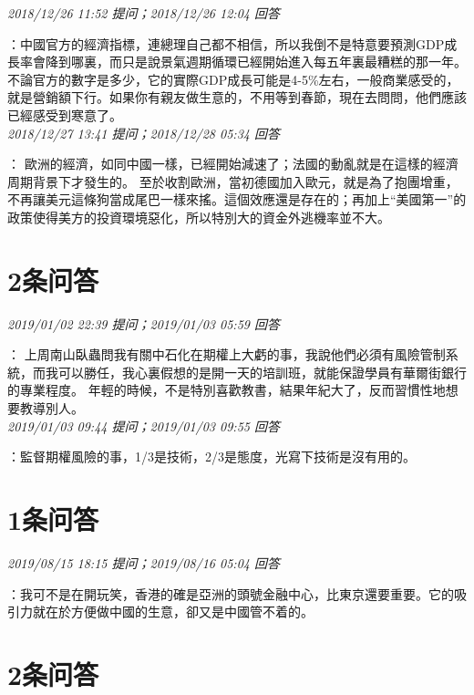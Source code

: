 \documentclass[twocolumn]{ctexart}
\begin{document}
\textit{\hfill\noindent\small 2018/12/26 11:52 提问；2018/12/26 12:04 回答}

：中國官方的經濟指標，連總理自己都不相信，所以我倒不是特意要預測GDP成長率會降到哪裏，而只是說景氣週期循環已經開始進入每五年裏最糟糕的那一年。不論官方的數字是多少，它的實際GDP成長可能是4-5\%左右，一般商業感受的，就是營銷額下行。如果你有親友做生意的，不用等到春節，現在去問問，他們應該已經感受到寒意了。
\\

\textit{\hfill\noindent\small 2018/12/27 13:41 提问；2018/12/28 05:34 回答}

：
歐洲的經濟，如同中國一樣，已經開始減速了；法國的動亂就是在這樣的經濟周期背景下才發生的。
至於收割歐洲，當初德國加入歐元，就是為了抱團增重，不再讓美元這條狗當成尾巴一樣來搖。這個效應還是存在的；再加上“美國第一”的政策使得美方的投資環境惡化，所以特別大的資金外逃機率並不大。
\\

\section{2条问答}

\textit{\hfill\noindent\small 2019/01/02 22:39 提问；2019/01/03 05:59 回答}

：
上周南山臥蟲問我有關中石化在期權上大虧的事，我說他們必須有風險管制系統，而我可以勝任，我心裏假想的是開一天的培訓班，就能保證學員有華爾街銀行的專業程度。
年輕的時候，不是特別喜歡教書，結果年紀大了，反而習慣性地想要教導別人。
\\

\textit{\hfill\noindent\small 2019/01/03 09:44 提问；2019/01/03 09:55 回答}

：監督期權風險的事，1/3是技術，2/3是態度，光寫下技術是沒有用的。
\\

\section{1条问答}

\textit{\hfill\noindent\small 2019/08/15 18:15 提问；2019/08/16 05:04 回答}

：我可不是在開玩笑，香港的確是亞洲的頭號金融中心，比東京還要重要。它的吸引力就在於方便做中國的生意，卻又是中國管不着的。
\\

\section{2条问答}
\end{document}
